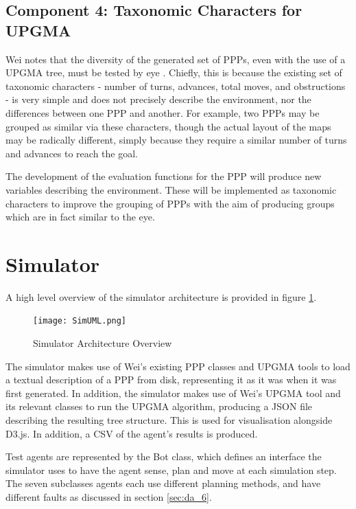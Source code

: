 \documentclass[authoryearcitations]{UoYCSproject}
\begin{document}
\subsection{Component 4: Taxonomic Characters for UPGMA}
\label{sec:da_3_4}
Wei notes that the diversity of the generated set of PPPs, even with the use of a UPGMA tree, must be tested by eye \cite[p.66]{wei}. Chiefly, this is because the existing set of taxonomic characters - number of turns, advances, total moves, and obstructions - is very simple and does not precisely describe the environment, nor the differences between one PPP and another. For example, two PPPs may be grouped as similar via these characters, though the actual layout of the maps may be radically different, simply because they require a similar number of turns and advances to reach the goal.

The development of the evaluation functions for the PPP will produce new variables describing the environment. These will be implemented as taxonomic characters to improve the grouping of PPPs with the aim of producing groups which are in fact similar to the eye.

\section{Simulator}
\label{sec:da_4}
A high level overview of the simulator architecture is provided in figure \ref{fig:sim_uml}.

\begin{figure}
\graphicspath{ {DesignImpPics/} }
\texttt{[image: SimUML.png]}
\caption{Simulator Architecture Overview}
\label{fig:sim_uml}
\end{figure}

The simulator makes use of Wei's existing PPP classes and UPGMA tools to load a textual description of a PPP from disk, representing it as it was when it was first generated. In addition, the simulator makes use of Wei's UPGMA tool and its relevant classes to run the UPGMA algorithm, producing a JSON file describing the resulting tree structure. This is used for visualisation alongside D3.js. In addition, a CSV of the agent’s results is produced.

Test agents are represented by the Bot class, which defines an interface the simulator uses to have the agent sense, plan and move at each simulation step. The seven subclasses agents each use different planning methods, and have different faults as discussed in section \ref{sec:da_6}.
\end{document}
